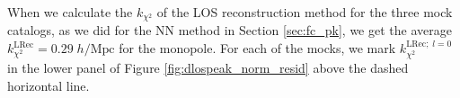                                                                                                                                                                                                                                                                          When we calculate the $k_{\chi^2}$ of the LOS reconstruction method for 
                                                                                                                                                                                                                                                                         the three mock catalogs, as we did for the NN method in Section \ref{sec:fc_pk}, 
                                                                                                                                                                                                                                                                         we get the average $k_{\chi^2}^\mathrm{LRec} = 0.29\;h/\mathrm{Mpc}$ for the monopole. 
                                                                                                                                                                                                                                                                         For each of the mocks, we mark $k_{\chi^2}^{\mathrm{LRec};\;l=0}$ in the lower panel 
                                                                                                                                                                                                                                                                         of Figure \ref{fig:dlospeak_norm_resid} above the dashed horizontal line. 


